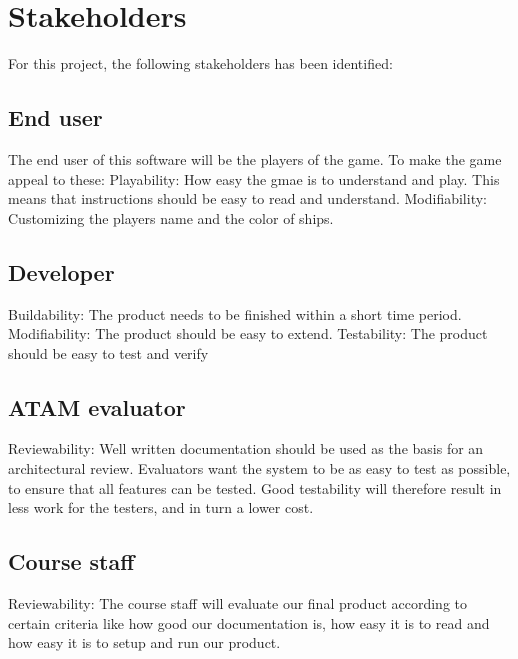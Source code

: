 \chapter{Stakeholders}
For this project, the following stakeholders has been identified:

    \section{End user}
    The end user of this software will be the players of the game. To make the game appeal to these:
    Playability: How easy the gmae is to understand and play. This means that instructions should be easy to read and understand. 
    Modifiability: Customizing the players name and the color of ships. 
    
    \section{Developer}
    Buildability: The product needs to be finished within a short time period.
    Modifiability: The product should be easy to extend.
    Testability: The product should be easy to test and verify
    
    \section{ATAM evaluator}
    Reviewability: Well written documentation should be used as the basis for an architectural review. Evaluators want the system to be as easy to test as possible, to ensure that all features can be tested. Good testability
    will therefore result in less work for the testers, and in turn a lower cost.

    \section{Course staff}
    Reviewability: The course staff will evaluate our final product according to certain criteria like how good our documentation is, how easy it is to read and how easy it is to setup and run our product.